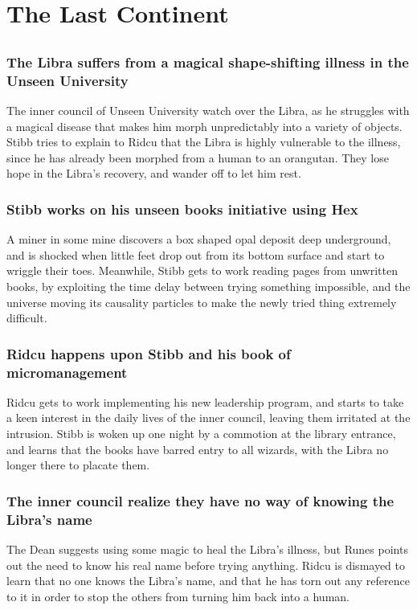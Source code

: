 \section{The Last Continent}


\subsection{}
\subsubsection{The \Gls{Libra} suffers from a magical shape-shifting illness in the Unseen
    University}
The inner council of Unseen University watch over the \Gls{Libra}, as he struggles with a magical
disease that makes him morph unpredictably into a variety of objects. \Gls{Stibb} tries to explain
to \Gls{Ridcu} that the \Gls{Libra} is highly vulnerable to the illness, since he has already been
morphed from a human to an orangutan. They lose hope in the \Gls{Libra}'s recovery, and wander off
to let him rest.

\subsubsection{\Gls{Stibb} works on his unseen books initiative using \Gls{Hex}}
A miner in some mine discovers a box shaped opal deposit deep underground, and is shocked when
little feet drop out from its bottom surface and start to wriggle their toes. Meanwhile, \Gls{Stibb}
gets to work reading pages from unwritten books, by exploiting the time delay between trying
something impossible, and the universe moving its causality particles to make the newly tried thing
extremely difficult.

\subsubsection{\Gls{Ridcu} happens upon \Gls{Stibb} and his book of micromanagement}
\Gls{Ridcu} gets to work implementing his new leadership program, and starts to take a keen interest
in the daily lives of the inner council, leaving them irritated at the intrusion. \Gls{Stibb} is
woken up one night by a commotion at the library entrance, and learns that the books have barred
entry to all wizards, with the \Gls{Libra} no longer there to placate them.

\subsubsection{The inner council realize they have no way of knowing the \Gls{Libra}'s name}
The \Gls{Dean} suggests using some magic to heal the \Gls{Libra}'s illness, but \Gls{Runes} points
out the need to know his real name before trying anything. \Gls{Ridcu} is dismayed to learn that no
one knows the \Gls{Libra}'s name, and that he has torn out any reference to it in order to stop the
others from turning him back into a human.

